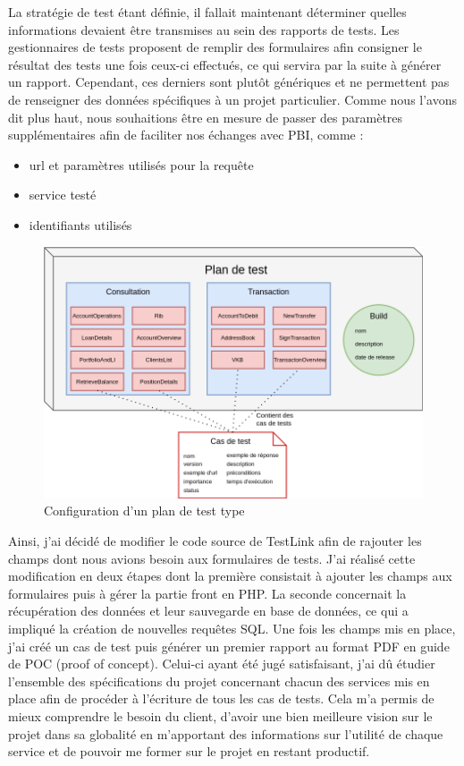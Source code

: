 	La stratégie de test étant définie, il fallait maintenant déterminer quelles informations devaient être transmises au sein des rapports de tests. Les gestionnaires de tests proposent de remplir des formulaires afin consigner le résultat des tests une fois ceux-ci effectués, ce qui servira par la suite à générer un rapport. Cependant, ces derniers sont plutôt génériques et ne permettent pas de renseigner des données spécifiques à un projet particulier. Comme nous l'avons dit plus haut, nous souhaitions être en mesure de passer des paramètres supplémentaires afin de faciliter nos échanges avec PBI, comme : \\
	
	\begin{itemize}
		\item url et paramètres utilisés pour la requête
		\item service testé
		\item identifiants utilisés
	\end{itemize}
	
	\begin{figure}[h!]
		\includegraphics[scale=0.5]{images/travailNeuflizeOBC/testsFonc/testlink.png}
		\centering
		\caption{Configuration d'un plan de test type}
		\label{testlink}
	\end{figure}
	
	Ainsi, j'ai décidé de modifier le code source de TestLink afin de rajouter les champs dont nous avions besoin aux formulaires de tests. J'ai réalisé cette modification en deux étapes dont la première consistait à ajouter les champs aux formulaires puis à gérer la partie front en PHP. La seconde concernait la récupération des données et leur sauvegarde en base de données, ce qui a impliqué la création de nouvelles requêtes SQL. Une fois les champs mis en place, j'ai créé un cas de test puis générer un premier rapport au format PDF en guide de POC (proof of concept). Celui-ci ayant été jugé satisfaisant, j'ai dû étudier l'ensemble des spécifications du projet concernant chacun des services mis en place afin de procéder à l'écriture de tous les cas de tests. Cela m'a permis de mieux comprendre le besoin du client, d'avoir une bien meilleure vision sur le projet dans sa globalité en m'apportant des informations sur l'utilité de chaque service et de pouvoir me former sur le projet en restant productif.
	
